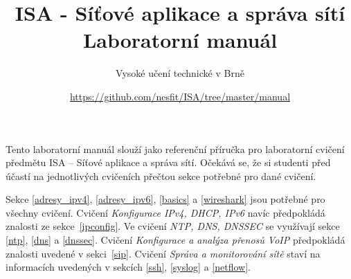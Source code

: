 \documentclass[a4paper,11pt]{article}
\title{ISA - Síťové aplikace a správa sítí\\
{\bf\large Laboratorní manuál}}
\author{Vysoké učení technické v Brně}
\date{\url{https://github.com/nesfit/ISA/tree/master/manual}}
\begin{document}
{\let\newpage\relax\maketitle}

Tento laboratorní manuál slouží jako referenční příručka pro laboratorní cvičení
předmětu ISA -- Síťové aplikace a správa sítí. Očekává se, že si studenti před
účastí na jednotlivých cvičeních přečtou sekce potřebné pro dané cvičení.

Sekce \ref{adresy_ipv4}, \ref{adresy_ipv6}, \ref{basics} a \ref{wireshark} jsou
potřebné pro všechny cvičení. Cvičení \emph{Konfigurace IPv4, DHCP, IPv6} navíc
předpokládá znalosti ze sekce~\ref{ipconfig}. Ve cvičení \emph{NTP, DNS,
DNSSEC} se využívají sekce \ref{ntp}, \ref{dns} a \ref{dnssec}. Cvičení
\emph{Konfigurace a analýza přenosů VoIP} předpokládá znalosti uvedené v
sekci~\ref{sip}. Cvičení \emph{Správa a monitorování sítě} staví na informacích
uvedených v sekcích \ref{ssh}, \ref{syslog} a \ref{netflow}.

\setcounter{tocdepth}{1}
\tableofcontents
\newpage










\newpage




\newpage
\thispagestyle{empty}
\end{document}
